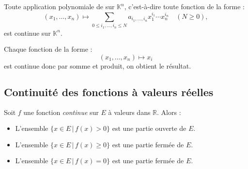 \documentclass[french,11pt,twoside]{VcCours}
\begin{document}
\begin{Proposition}{} Toute application polynomiale de sur $\mathbb{K}^n$, c'est-à-dire toute fonction de la forme :
$$ (x_1, \ldots, x_n) \mapsto \sum_{0 \leq i_1, \ldots, i_n \leq N} a_{i_1, \ldots, i_n} x_1^{i_1} \cdots x_n^{i_n} \quad (N \geq 0),$$
est continue sur $\mathbb{K}^n$.
\end{Proposition}

\begin{Demonstration}{} Chaque fonction de la forme :
$$  (x_1, \ldots, x_n) \mapsto x_i$$
est continue donc par somme et produit, on obtient le résultat.
\end{Demonstration}



\subsection{Continuité des fonctions à valeurs réelles}

\begin{Proposition}{} Soit $f$ une fonction \emph{continue} sur $E$ à valeurs dans $\mathbb{R}$. Alors :

\begin{itemize}
\item L'ensemble $\lbrace x \in E \, \vert \, f(x)>0 \rbrace$ est une partie ouverte de $E$.
\item L'ensemble $\lbrace x \in E \, \vert \, f(x)\geq 0 \rbrace$ est une partie fermée de $E$.
\item L'ensemble $\lbrace x \in E \, \vert \, f(x) = 0 \rbrace$ est une partie fermée de $E$.
\end{itemize}
\end{Proposition}

\begin{Demonstration}{} 

\vspace*{13cm}

\end{Demonstration}
\end{document}
